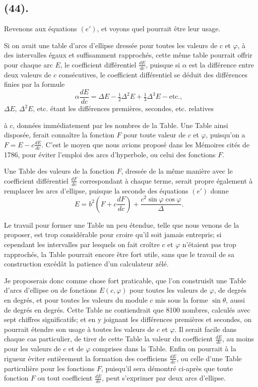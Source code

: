 \documentclass{article}
\begin{document}
\subsection*{(44).}

Revenons aux équations $(e')$, et voyons quel pourrait être leur usage.

Si on avait une table d'arcs d'ellipse dressée pour toutes les valeurs de $c$ et $\varphi$, à des intervalles égaux et suffisamment rapprochés, cette même table pourrait offrir pour chaque arc $E$, le coefficient différentiel $\frac{dE}{dc}$, puisque si $\alpha$ est la différence entre deux valeurs de $c$ consécutives, le coefficient différentiel se déduit des différences finies par la formule
\[ \alpha\frac{dE}{dc}=\Delta E-\tfrac{1}{2}\Delta^{2}E+\tfrac{1}{3}\Delta^{3}E-\text{etc.}, \]
$\Delta E$, $\Delta^{2}E$, etc. étant les différences premières, secondes, etc. relatives

à $c$, données immédiatement par les nombres de la Table. Une Table ainsi disposée, ferait connaître la fonction $F$ pour toute valeur de $c$ et $\varphi$, puisqu'on a $F=E-c\frac{dE}{dc}$. C'est le moyen que nous avions proposé dans les Mémoires cités de 1786, pour éviter l'emploi des arcs d'hyperbole, ou celui des fonctions $F$.

Une Table des valeurs de la fonction $F$, dressée de la même manière avec le coefficient différentiel $\frac{dF}{dc}$ correspondant à chaque terme, serait propre également à remplacer les arcs d'ellipse, puisque la seconde des équations $(e')$ donne
\[ E=b^{2}\left(F+c\frac{dF}{dc}\right)+\frac{c^{2}\sin\varphi\cos\varphi}{\Delta}. \]

Le travail pour former une Table un peu étendue, telle que nous venons de la proposer, est trop considérable pour croire qu'il soit jamais entrepris; si cependant les intervalles par lesquels on fait croître $c$ et $\varphi$ n'étaient pas trop rapprochés, la Table pourrait encore être fort utile, sans que le travail de sa construction excédât la patience d'un calculateur zélé.

Je proposerais donc comme chose fort praticable, que l'on construisît une Table d'arcs d'ellipse ou de fonctions $E(c,\varphi)$ pour toutes les valeurs de $\varphi$, de degrés en degrés, et pour toutes les valeurs du module $c$ mis sous la forme $\sin\theta$, aussi de degrés en degrés. Cette Table ne contiendrait que 8100 nombres, calculés avec sept chiffres significatifs; et en y joignant les différences premières et secondes, on pourrait étendre son usage à toutes les valeurs de $c$ et $\varphi$. Il serait facile dans chaque cas particulier, de tirer de cette Table la valeur du coefficient $\frac{dE}{dc}$, au moins pour les valeurs de $c$ et de $\varphi$ comprises dans la Table. Enfin on pourrait à la rigueur éviter entièrement la formation des coefficiens $\frac{dE}{dc}$, ou celle d'une Table particulière pour les fonctions $F$, puisqu'il sera démontré ci-après que toute fonction $F$ ou tout coefficient $\frac{dE}{dc}$, peut s'exprimer par deux arcs d'ellipse.
\end{document}

